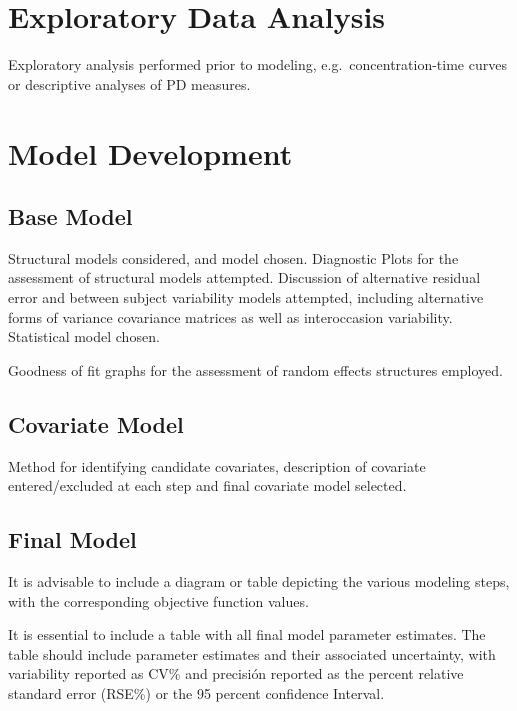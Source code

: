 \documentclass[
  letterpaper,
  toc=chapterentrywithdots,
  11pt,
  headings=small]{scrreprt}
\begin{document}
\hypertarget{exploratory-data-analysis}{%
\section{Exploratory Data Analysis}\label{exploratory-data-analysis}}

Exploratory analysis performed prior to modeling,
e.g.~concentration-time curves or descriptive analyses of PD measures.

\hypertarget{model-development}{%
\section{Model Development}\label{model-development}}

\hypertarget{base-model}{%
\subsection{Base Model}\label{base-model}}

Structural models considered, and model chosen. Diagnostic Plots for the
assessment of structural models attempted. Discussion of alternative
residual error and between subject variability models attempted,
including alternative forms of variance covariance matrices as well as
interoccasion variability. Statistical model chosen.

Goodness of fit graphs for the assessment of random effects structures
employed.

\hypertarget{covariate-model}{%
\subsection{Covariate Model}\label{covariate-model}}

Method for identifying candidate covariates, description of covariate
entered/excluded at each step and final covariate model selected.

\hypertarget{final-model}{%
\subsection{Final Model}\label{final-model}}

It is advisable to include a diagram or table depicting the various
modeling steps, with the corresponding objective function values.

It is essential to include a table with all final model parameter
estimates. The table should include parameter estimates and their
associated uncertainty, with variability reported as CV\% and precisión
reported as the percent relative standard error (RSE\%) or the 95
percent confidence Interval.
\end{document}
